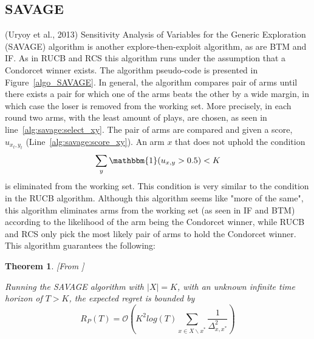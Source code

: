 \documentclass[MSc,beforeExam]{iitcsthesis}
\newtheorem{theorem}{Theorem}
\begin{document}
\subsection{SAVAGE}
	(Uryoy et al., 2013)\cite{urvoy2013generic} Sensitivity Analysis of Variables for the Generic Exploration (SAVAGE) algorithm is another explore-then-exploit algorithm, as are BTM and IF.
	As in RUCB and RCS this algorithm runs under the assumption that a Condorcet winner exists.
	The algorithm pseudo-code is presented in Figure~\ref{algo_SAVAGE}.
	In general, the algorithm compares pair of  arms until there exists a pair for which one of the arms beats the other by a wide margin, in which case the loser is removed from the working set.
	More precisely, in each round two arms, with the least amount of plays, are chosen, as seen in line~\ref{alg:savage:select_xy}.
	The pair of arms are compared and given a score, $u_{x_t, y_t}$ (Line~\ref{alg:savage:score_xy}).
	An arm $x$ that does not uphold the condition
	$$\sum_{y}\mathbbm{1}(u_{x,y} > 0.5) < K $$
	is eliminated from the working set.
	This condition is very similar to the condition in the RUCB algorithm.
	Although this algorithm seems like "more of the same", this algorithm eliminates arms from the working set (as seen in IF and BTM) according to the likelihood of the arm being the Condorcet winner, while RUCB and RCS only pick the most likely pair of arms to hold the Condorcet winner.
	This algorithm guarantees the following:
	\begin{theorem}\label{thm:SAVAGE}[From \cite{urvoy2013generic}]

		Running the SAVAGE algorithm with $|X|=K$, with an unknown infinite time horizon of $T>K$, the expected regret is bounded by $$R_P(T) = \mathcal{O} \left( K^2 log( T ) \sum\limits_{x\in X \backslash x^*} \frac{1}{\Delta_{x,x^*}^2}\right)$$

	\end{theorem}
	
\end{document}

